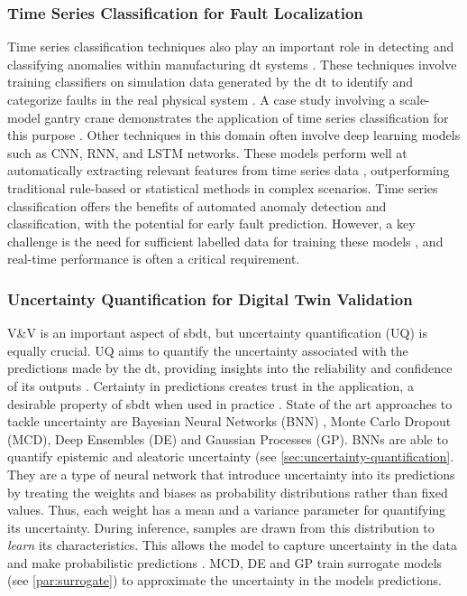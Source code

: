 \subsubsection*{Time Series Classification for Fault Localization}
Time series classification techniques also play an important role in detecting and classifying anomalies within manufacturing \gls{dt} systems \autocite{Lugaresi2023compind}. These techniques involve training classifiers on simulation data generated by the \gls{dt} to identify and categorize faults in the real physical system \autocite{dihan2024digital}. A case study involving a scale-model gantry crane demonstrates the application of time series classification for this purpose \autocite{mertens2024localizing}.
Other techniques in this domain often involve deep learning models such as CNN, RNN, and LSTM networks. These models perform well at automatically extracting relevant features from time series data \autocite{cao2023real}, outperforming traditional rule-based or statistical methods in complex scenarios. Time series classification offers the benefits of automated anomaly detection and classification, with the potential for early fault prediction. However, a key challenge is the need for sufficient labelled data for training these models \autocite{zemskov2024security}, and real-time performance is often a critical requirement.

\subsubsection*{Uncertainty Quantification for Digital Twin Validation}
\label{sec:uq-dt}
V\&V is an important aspect of \gls{sbdt}, but uncertainty quantification (UQ) is equally crucial. UQ aims to quantify the uncertainty associated with the predictions made by the \gls{dt}, providing insights into the reliability and confidence of its outputs \autocite{sel2025survey}. Certainty in predictions creates trust in the application, a desirable property of \gls{sbdt} when used in practice \autocite{dwivedi2023explainable}. State of the art approaches to tackle uncertainty are Bayesian Neural Networks (BNN) \autocite{li2017dynamic}, Monte Carlo Dropout (MCD), Deep Ensembles (DE) and Gaussian Processes (GP). BNNs are able to quantify epistemic and aleatoric uncertainty (see \autoref{sec:uncertainty-quantification}. They are a type of neural network that introduce uncertainty into its predictions by treating the weights and biases as probability distributions rather than fixed values. Thus, each weight has a mean and a variance parameter for quantifying its uncertainty. During inference, samples are drawn from this distribution to \textit{learn} its characteristics. This allows the model to capture uncertainty in the data and make probabilistic predictions \autocite{li2017dynamic}. MCD, DE and GP train surrogate models (see \autoref{par:surrogate}) to approximate the uncertainty in the models predictions.

